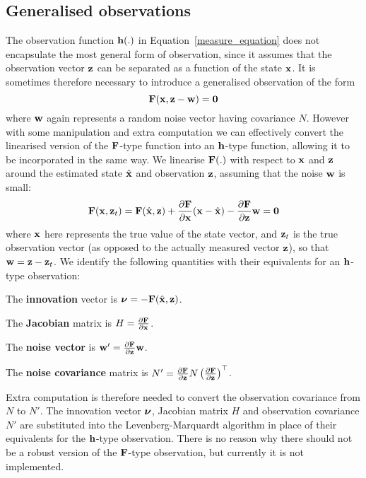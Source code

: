 \subsection{Generalised observations}
The observation function ${\bf h}(.)$ in Equation~\ref{measure_equation}
does not encapsulate the most general
form of observation, since it assumes that the observation vector ${\bf z}$
can be separated as a function of the state ${\bf x}$. It is sometimes therefore
necessary to introduce a generalised observation of the form
\[ {\bf F}({\bf x},{\bf z}-{\bf w}) = {\bf 0}
\]
where ${\bf w}$ again represents a random noise vector having covariance $N$.
However with some manipulation and extra computation we can effectively
convert the linearised version of the ${\bf F}$-type function into an
${\bf h}$-type function, allowing it to be incorporated in the same way.
We linearise ${\bf F}(.)$ with respect to ${\bf x}$ and ${\bf z}$ around the
estimated state $\hat{\bf x}$ and observation ${\bf z}$, assuming
that the noise ${\bf w}$ is small:
\[ {\bf F}({\bf x},{\bf z}_t) = {\bf F}(\hat{\bf x},{\bf z})
	+ \frac{\partial {\bf F}}{\partial {\bf x}} ({\bf x}-\hat{\bf x})
	- \frac{\partial {\bf F}}{\partial {\bf z}} {\bf w} = {\bf 0}
\]
where ${\bf x}$ here represents the true value of the state vector, and ${\bf z}_t$
is the true observation vector (as opposed to the actually measured vector
${\bf z}$), so that ${\bf w} = {\bf z}-{\bf z}_t$.
We identify the following quantities with their equivalents for an ${\bf h}$-type
observation:
\begin{description}
  \item{The {\bf innovation}} vector is $\mbox{\boldmath $\nu$}=-{\bf F}(\hat{\bf x},{\bf z})$.
  \item{The {\bf Jacobian}} matrix is
	$H=\frac{\partial {\bf F}}{\partial {\bf x}}$.
  \item{The {\bf noise vector}} is
	${\bf w}' = \frac{\partial {\bf F}}{\partial {\bf z}} {\bf w}$.
  \item{The {\bf noise covariance}} matrix is
	$N' = \frac{\partial {\bf F}}{\partial {\bf z}} N \left(\frac{\partial {\bf F}}{\partial {\bf z}}\right)^{\top}$.
\end{description}
Extra computation is therefore needed to convert the observation covariance
from $N$ to $N'$. The innovation vector $\mbox{\boldmath $\nu$}$, Jacobian matrix $H$ and
observation covariance $N'$ are substituted into the Levenberg-Marquardt
algorithm in place of their equivalents for the ${\bf h}$-type observation.
There is no reason why there should not be a robust version of the ${\bf F}$-type
observation, but currently it is not implemented.

